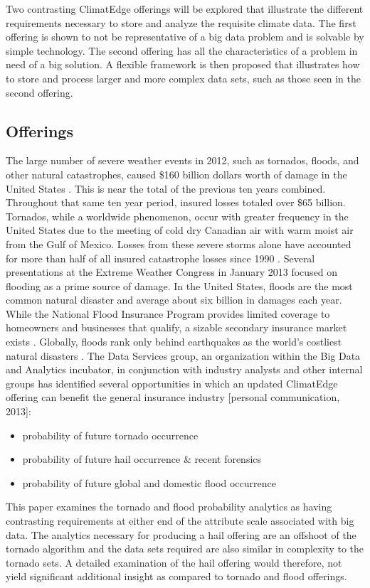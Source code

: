 Two contrasting ClimatEdge offerings will be explored that illustrate the different requirements necessary to store and analyze the requisite climate data. The first offering is shown to not be representative of a big data problem and is solvable by simple technology. The second offering has all the characteristics of a problem in need of a big solution. A flexible framework is then proposed that illustrates how to store and process larger and more complex data sets, such as those seen in the second offering.
\subsection{Offerings}
The large number of severe weather events in 2012, such as tornados, floods, and other natural catastrophes, caused \$160 billion dollars worth of damage in the United States \cite{stalder}. This is near the total of the previous ten years combined. Throughout that same ten year period, insured losses totaled over \$65 billion. Tornados, while a worldwide phenomenon, occur with greater frequency in the United States due to the meeting of cold dry Canadian air with warm moist air from the Gulf of Mexico. Losses from these severe storms alone have accounted for more than half of all insured catastrophe losses since 1990 \cite{lloyds}. Several presentations at the Extreme Weather Congress in January 2013 focused on flooding as a prime source of damage. In the United States, floods are the most common natural disaster and average about six billion in damages each year. While the National Flood Insurance Program provides limited coverage to homeowners and businesses that qualify, a sizable secondary insurance market exists \cite{hope}. Globally, floods rank only behind earthquakes as the world's costliest natural disasters \cite{li}. The Data Services group, an organization within the Big Data and Analytics incubator, in conjunction with industry analysts and other internal groups has identified several opportunities in which an updated ClimatEdge offering can benefit the general insurance industry [personal communication, 2013]:
\begin{itemize}
    \item probability of future tornado occurrence
    \item probability of future hail occurrence \& recent forensics
    \item probability of future global and domestic flood occurrence
\end{itemize}
This paper examines the tornado and flood probability analytics as having contrasting requirements at either end of the attribute scale associated with big data. The analytics necessary for producing a hail offering are an offshoot of the tornado algorithm and the data sets required are also similar in complexity to the tornado sets. A detailed examination of the hail offering would therefore, not yield significant additional insight as compared to tornado and flood offerings.